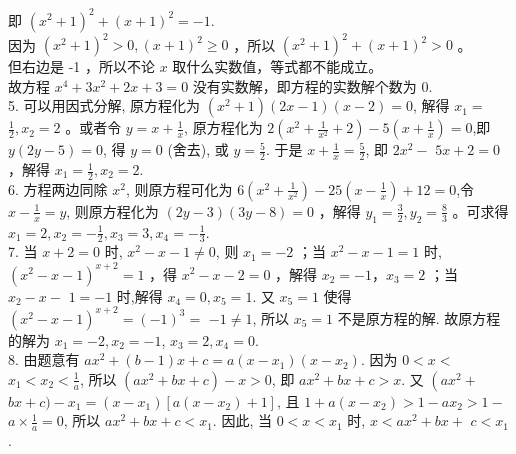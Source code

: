 \documentclass[10pt]{article}
\begin{document}
即 $\left(x^{2}+1\right)^{2}+(x+1)^{2}=-1$.\\
因为 $\left(x^{2}+1\right)^{2}>0,(x+1)^{2} \geqslant 0$ ，所以 $\left(x^{2}+1\right)^{2}+(x+1)^{2}>0$ 。\\
但右边是 -1 ，所以不论 $x$ 取什么实数值，等式都不能成立。\\
故方程 $x^{4}+3 x^{2}+2 x+3=0$ 没有实数解，即方程的实数解个数为 0.\\
5. 可以用因式分解, 原方程化为 $\left(x^{2}+1\right)(2 x-1)(x-2)=0$, 解得 $x_{1}=$ $\frac{1}{2}, x_{2}=2$ 。或者令 $y=x+\frac{1}{x}$, 原方程化为 $2\left(x^{2}+\frac{1}{x^{2}}+2\right)-5\left(x+\frac{1}{x}\right)=0$,即 $y(2 y-5)=0$, 得 $y=0$ (舍去), 或 $y=\frac{5}{2}$. 于是 $x+\frac{1}{x}=\frac{5}{2}$, 即 $2 x^{2}-$ $5 x+2=0$ ，解得 $x_{1}=\frac{1}{2}, x_{2}=2$.\\
6. 方程两边同除 $x^{2}$, 则原方程可化为 $6\left(x^{2}+\frac{1}{x^{2}}\right)-25\left(x-\frac{1}{x}\right)+12=0$,令 $x-\frac{1}{x}=y$, 则原方程化为 $(2 y-3)(3 y-8)=0$ ，解得 $y_{1}=\frac{3}{2}, y_{2}=\frac{8}{3}$ 。可求得 $x_{1}=2, x_{2}=-\frac{1}{2}, x_{3}=3, x_{4}=-\frac{1}{3}$.\\
7. 当 $x+2=0$ 时, $x^{2}-x-1 \neq 0$, 则 $x_{1}=-2$ ；当 $x^{2}-x-1=1$ 时, $\left(x^{2}-x-1\right)^{x+2}=1$ ，得 $x^{2}-x-2=0$ ，解得 $x_{2}=-1 ， x_{3}=2$ ；当 $x_{2}-x-$ $1=-1$ 时,解得 $x_{4}=0, x_{5}=1$. 又 $x_{5}=1$ 使得 $\left(x^{2}-x-1\right)^{x+2}=(-1)^{3}=$ $-1 \neq 1$, 所以 $x_{5}=1$ 不是原方程的解. 故原方程的解为 $x_{1}=-2, x_{2}=-1$, $x_{3}=2, x_{4}=0$.\\
8. 由题意有 $a x^{2}+(b-1) x+c=a\left(x-x_{1}\right)\left(x-x_{2}\right)$. 因为 $0<x<$ $x_{1}<x_{2}<\frac{1}{a}$, 所以 $\left(a x^{2}+b x+c\right)-x>0$, 即 $a x^{2}+b x+c>x$. 又 $\left(a x^{2}+\right.$ $b x+c)-x_{1}=\left(x-x_{1}\right)\left[a\left(x-x_{2}\right)+1\right]$, 且 $1+a\left(x-x_{2}\right)>1-a x_{2}>1-$ $a \times \frac{1}{a}=0$, 所以 $a x^{2}+b x+c<x_{1}$. 因此, 当 $0<x<x_{1}$ 时, $x<a x^{2}+b x+$ $c<x_{1}$.
\end{document}
